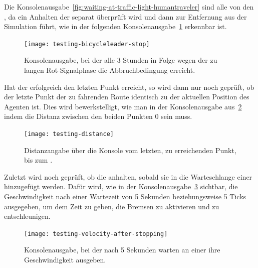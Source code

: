 Die Konsolenausgabe~\ref{fig:waiting-at-traffic-light-humantraveler} sind alle von den , da ein Anhalten der  separat überprüft wird und dann zur Entfernung aus der Simulation führt, wie in der folgenden Konsolenausgabe~\ref{fig:waiting-at-traffic-light-bicycleleader} erkennbar ist.

\begin{figure}[h]
    \centering
    \texttt{[image: testing-bicycleleader-stop]}~\caption{Konsolenausgabe, bei der  alle 3 Stunden in Folge wegen der zu langen Rot-Signalphase die Abbruchbedingung erreicht.}
    \label{fig:waiting-at-traffic-light-bicycleleader}
\end{figure}

Hat der  erfolgreich den letzten Punkt erreicht, so wird dann nur noch geprüft, ob der letzte Punkt der zu fahrenden Route identisch zu der aktuellen Position des Agenten ist.
Dies wird bewerkstelligt, wie man in der Konsolenausgabe aus~\ref{fig:testing-successful-trip} indem die Distanz zwischen den beiden Punkten 0 sein muss.

\begin{figure}[h]
    \centering
    \texttt{[image: testing-distance]}~\caption{Distanzangabe über die Konsole vom letzten, zu erreichenden Punkt, bis zum .}
    \label{fig:testing-successful-trip}
\end{figure}


Zuletzt wird noch geprüft, ob die  anhalten, sobald sie in die Warteschlange einer  hinzugefügt werden.
Dafür wird, wie in der Konsolenausgabe~\ref{fig:human-traveler-slowing-down} sichtbar, die Geschwindigkeit nach einer Wartezeit von 5 Sekunden beziehungsweise 5 Ticks ausgegeben, um dem  Zeit zu geben, die Bremsen zu aktivieren und zu entschleunigen.

\begin{figure}[h]
    \centering
    \texttt{[image: testing-velocity-after-stopping]}~\caption{Konsolenausgabe, bei der  nach 5 Sekunden warten an einer  ihre Geschwindigkeit ausgeben.}
    \label{fig:human-traveler-slowing-down}
\end{figure}
